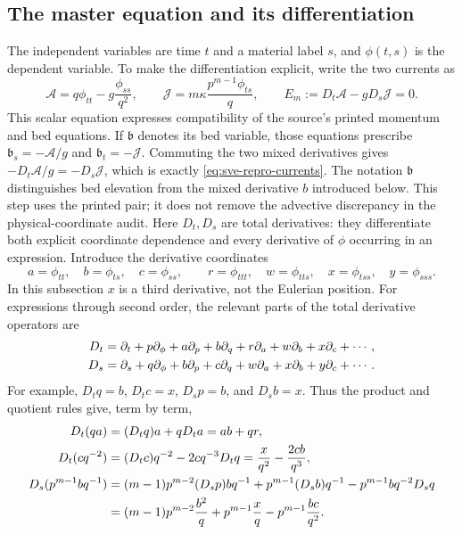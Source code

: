 \subsection{The master equation and its differentiation}
The independent variables are time $t$ and a material label $s$, and
$\phi(t,s)$ is the dependent variable. To make the differentiation explicit,
write the two currents as
\begin{equation}
 \mathcal A=q\phi_{tt}-g\frac{\phi_{ss}}{q^2},\qquad
 \mathcal J=m\kappa\frac{p^{m-1}\phi_{ts}}{q},\qquad
 E_m:=D_t\mathcal A-gD_s\mathcal J=0.
 \label{eq:sve-repro-currents}
\end{equation}
This scalar equation expresses compatibility of the source's printed
momentum and bed equations. If $\mathfrak b$ denotes its bed variable,
those equations prescribe $\mathfrak b_s=-\mathcal A/g$ and
$\mathfrak b_t=-\mathcal J$. Commuting the two mixed derivatives gives
$-D_t\mathcal A/g=-D_s\mathcal J$, which is exactly
\eqref{eq:sve-repro-currents}. The notation $\mathfrak b$ distinguishes
bed elevation from the mixed derivative $b$ introduced below. This step
uses the printed pair; it does not remove the advective discrepancy in
the physical-coordinate audit.
Here $D_t,D_s$ are total derivatives: they differentiate both explicit
coordinate dependence and every derivative of $\phi$ occurring in an
expression. Introduce the derivative coordinates
\[
 a=\phi_{tt},\quad b=\phi_{ts},\quad c=\phi_{ss},\qquad
 r=\phi_{ttt},\quad w=\phi_{tts},\quad x=\phi_{tss},\quad y=\phi_{sss}.
\]
In this subsection $x$ is a third derivative, not the Eulerian position.
For expressions through second order, the relevant parts of the total
derivative operators are
\begin{align}
 D_t&=\partial_t+p\partial_\phi+a\partial_p+b\partial_q
                 +r\partial_a+w\partial_b+x\partial_c+\cdots,\notag\\
 D_s&=\partial_s+q\partial_\phi+b\partial_p+c\partial_q
                 +w\partial_a+x\partial_b+y\partial_c+\cdots.
 \label{eq:sve-total-operators}
\end{align}
For example, $D_tq=b$, $D_tc=x$, $D_sp=b$, and $D_sb=x$.
Thus the product and quotient rules give, term by term,
\begin{align}
 D_t(qa)&=(D_tq)a+qD_ta=ab+qr,\notag\\
 D_t(cq^{-2})&=(D_tc)q^{-2}-2cq^{-3}D_tq
                =\frac{x}{q^2}-\frac{2cb}{q^3},\notag\\
 D_s(p^{m-1}bq^{-1})
   &=(m-1)p^{m-2}(D_sp)bq^{-1}
       +p^{m-1}(D_sb)q^{-1}-p^{m-1}bq^{-2}D_sq\notag\\
   &=(m-1)p^{m-2}\frac{b^2}{q}
       +p^{m-1}\frac{x}{q}-p^{m-1}\frac{bc}{q^2}.
 \label{eq:sve-current-differentiation}
\end{align}
